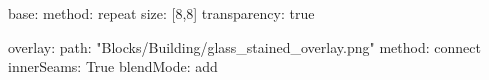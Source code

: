 base:
  method: repeat
  size: [8,8]
  transparency: true
  
overlay:
  path: "Blocks/Building/glass_stained_overlay.png"
  method: connect
  innerSeams: True
blendMode: add
